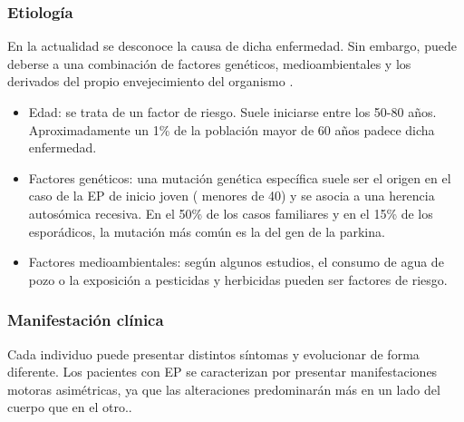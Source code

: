 \subsubsection{Etiología}

En la actualidad se desconoce la causa de dicha enfermedad. Sin embargo, puede deberse a una combinación de factores genéticos, medioambientales y los derivados del propio envejecimiento del organismo \cite{ayala2007enfermedad, MARTINEZFERNANDEZ2016363}. 

\begin{itemize}
    \item Edad: se trata de un factor de riesgo. Suele iniciarse entre los 50-80 años. Aproximadamente un 1\% de la población mayor de 60 años padece dicha enfermedad.
    \item Factores genéticos: una mutación genética específica suele ser el origen en el caso de la EP de inicio joven ( menores de 40) y se asocia a una herencia autosómica recesiva. En el 50\% de los casos familiares y en el 15\% de los esporádicos, la mutación más común es la del gen de la parkina.
    \item Factores medioambientales: según algunos estudios, el consumo de agua de pozo o la exposición a pesticidas y herbicidas pueden ser factores de riesgo.
\end{itemize}


\subsubsection{Manifestación clínica}
Cada individuo puede presentar distintos síntomas y evolucionar de forma diferente. Los pacientes con EP se caracterizan por presentar manifestaciones motoras asimétricas, ya que las alteraciones predominarán más en un lado del cuerpo que en el otro.\cite{neri2017sintomas}.

